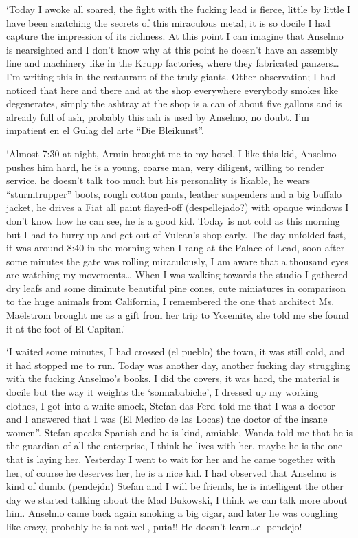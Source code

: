\documentclass[smalldemyvopaper,11pt,twoside,onecolumn,openright,extrafontsizes]{memoir}
\begin{document}
‘Today I awoke all soared, the fight with the fucking lead is fierce, little by little I have been snatching the secrets of this miraculous metal; it is so docile I had capture the impression of its richness. At this point I can imagine that Anselmo is nearsighted and I don’t know why at this point he doesn’t have an assembly line and machinery like in the Krupp factories, where they fabricated panzers… I’m writing this in the restaurant of the truly giants. Other observation; I had noticed that here and there and at the shop  everywhere everybody smokes like degenerates, simply the ashtray at the shop is a can of about five gallons and is already full of ash, probably this ash is used by Anselmo, no doubt. I’m impatient en el Gulag del arte “Die Bleikunst”.

\ornamentbreak

‘Almost 7:30 at night, Armin brought me to my hotel, I like this kid, Anselmo pushes him hard, he is a young, coarse man, very diligent, willing to render service, he doesn’t talk too much but his personality is likable, he wears “sturmtrupper” boots, rough cotton pants, leather suspenders and a big buffalo jacket, he drives a Fiat all paint flayed-off (despellejado?) with opaque windows I don’t know how he can see, he is a good kid. Today is not cold as this morning but I had to hurry up and get out of Vulcan’s shop early. The day unfolded fast, it was around 8:40 in the morning when I rang at the Palace of Lead, soon after some minutes the gate was rolling miraculously, I am aware that a thousand eyes are watching my movements… When I was walking towards the studio I gathered dry leafs and some diminute beautiful pine cones, cute miniatures in comparison to the huge animals from California, I remembered the one that architect Ms. Maëlstrom brought me as a gift from her trip to Yosemite, she told me she found it at the foot of El Capitan.’

‘I waited some minutes, I had crossed (el pueblo) the town, it was still cold, and it had stopped me to run. Today was another day, another fucking day struggling with the fucking Anselmo’s books. I did the covers, it was hard, the material is docile but the way it weights the ‘sonnababiche’, I dressed up my working clothes, I got into a white smock, Stefan das Ferd told me that I was a doctor and I answered that I was (El Medico de las Locas) the doctor of the insane women”. Stefan speaks Spanish and he is kind, amiable, Wanda told me that he is the guardian of all the enterprise, I think he lives with her, maybe he is the one that is laying her. Yesterday I went to wait for her and he came together with her, of course he deserves her, he is a nice kid. I had observed that Anselmo is kind of dumb. (pendejón) Stefan and I will be friends, he is intelligent the other day we started talking about the Mad Bukowski, I think we can talk more about him. Anselmo came back again smoking a big cigar, and later he was coughing like crazy, probably he is not well, puta!! He doesn’t learn…el pendejo! 
\end{document}
